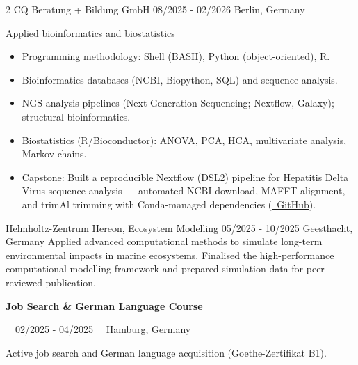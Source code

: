 \documentclass{thejus_cv}
\begin{document}
\begin{paracol}{2}
             {CQ Beratung + Bildung GmbH}
             {08/2025 - 02/2026}
             {Berlin, Germany}
             {Applied bioinformatics and biostatistics
             \begin{itemize}\setlength{\itemsep}{0.05em}
                 \item Programming methodology: Shell (BASH), Python (object-oriented), R.
                 \item Bioinformatics databases (NCBI, Biopython, SQL) and sequence analysis.
                 \item NGS analysis pipelines (Next-Generation Sequencing; Nextflow, Galaxy); structural bioinformatics.
                 \item Biostatistics (R/Bioconductor): ANOVA, PCA, HCA, multivariate analysis, Markov chains.
                 \item Capstone: Built a reproducible Nextflow (DSL2) pipeline for Hepatitis Delta Virus sequence analysis --- automated NCBI download, MAFFT alignment, and trimAl trimming with Conda-managed dependencies (\href{https://github.com/thejusmahajan/hepatitis-delta-pipeline}{\faGithub\ GitHub}).
             \end{itemize}}
\vspace{0.8em}
             {Helmholtz-Zentrum Hereon, Ecosystem Modelling}
             {05/2025 - 10/2025}
             {Geesthacht, Germany}
             {Applied advanced computational methods to simulate long-term environmental impacts in marine ecosystems. Finalised the high-performance computational modelling framework and prepared simulation data for peer-reviewed publication.}

\vspace{0.8em}
{\large\textbf{Job Search \& German Language Course}}\par
{\small\color{cvgray}\faCalendar\ \ 02/2025 - 04/2025 \hspace{0.5cm} \faMapMarker\ \ Hamburg, Germany}\par
\vspace{0.2em}
{\color{cvlightgray}\hdashrule{\linewidth}{0.5pt}{1mm}}\par
\vspace{0.2em}
Active job search and German language acquisition (Goethe-Zertifikat B1).
\vspace{0.3em}


\end{paracol}
\end{document}
